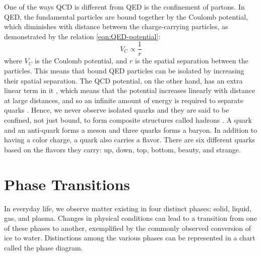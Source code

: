 One of the ways QCD is different from QED is the confinement of partons. In QED, the fundamental particles are bound together by the Coulomb potential, which diminishes with distance between the charge-carrying particles, as demonstrated by the relation \ref{eqn:QED-potential}:
\begin{equation}\label{eqn:QED-potential}
V_{C}\propto\frac{1}{r} 
\end{equation}
where $V_{C}$ is the Coulomb potential, and $r$ is the spatial separation between the particles. This means that bound QED particles can be isolated by increasing their spatial separation. The QCD potential, on the other hand, has an extra linear term in it%
, which means that the potential increases linearly with distance at large distances, and so an infinite amount of energy is required to separate quarks \cite{Bali:2000gf}. Hence, we never observe isolated quarks and they are said to be confined, not just bound, to form composite structures called hadrons \cite{0954-3899-32-3-R01}. A quark and an anti-quark forms a meson and three quarks forms a baryon. In addition to having a color charge, a quark also carries a flavor. There are six different quarks based on the flavors they carry: up, down, top, bottom, beauty, and strange.


\section{Phase Transitions}
In everyday life, we observe matter existing in four distinct phases: solid, liquid, gas, and plasma. Changes in physical conditions can lead to a transition from one of these phases to another, exemplified by the commonly observed conversion of ice to water. Distinctions among the various phases can be represented in a chart called the phase diagram.

